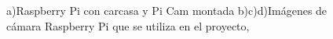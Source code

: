 \documentclass[letterpaper,12pt]{article}
\begin{document}
\begin{figure}[H]
\caption{a)Raspberry Pi con carcasa y Pi Cam montada b)c)d)Imágenes de cámara Raspberry Pi que se utiliza en el proyecto, \cite{ImagenesPiCam}}
\label{fig:Campi}
\end{figure}
\end{document}
